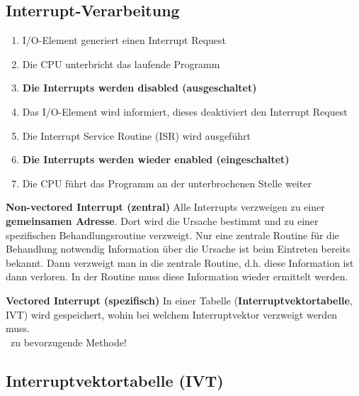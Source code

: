 \subsection{Interrupt-Verarbeitung}

\begin{enumerate}
    \item I/O-Element generiert einen Interrupt Request
    \item Die CPU unterbricht das laufende Programm
    \item \textbf{Die Interrupts werden disabled (ausgeschaltet)}
    \item Das I/O-Element wird informiert, dieses deaktiviert den Interrupt Request
    \item Die Interrupt Service Routine (ISR) wird ausgeführt
    \item \textbf{Die Interrupts werden wieder enabled (eingeschaltet)}
    \item Die CPU führt das Programm an der unterbrochenen Stelle weiter
\end{enumerate}



\begin{outline}
    \1 \textbf{Non-vectored Interrupt (zentral)}
        \2 Alle Interrupts verzweigen zu einer \textbf{gemeinsamen Adresse}. Dort wird die Ursache bestimmt und zu einer
            spezifischen Behandlungsroutine verzweigt.
        \2[+] Nur eine zentrale Routine für die Behandlung notwendig
        \2[--] Information über die Ursache ist beim Eintreten bereits bekannt. Dann
                verzweigt man in die zentrale Routine, d.h. diese Information ist dann verloren. In der Routine muss diese
                Information wieder ermittelt werden.
\end{outline}  


\begin{outline}
    \1 \textbf{Vectored Interrupt (spezifisch)}
        \2 In einer Tabelle (\textbf{Interruptvektortabelle}, IVT) wird gespeichert, wohin bei welchem Interruptvektor
            verzweigt werden muss. \\
            \textrightarrow\ zu bevorzugende Methode!
\end{outline}


\subsection{Interruptvektortabelle (IVT)}

